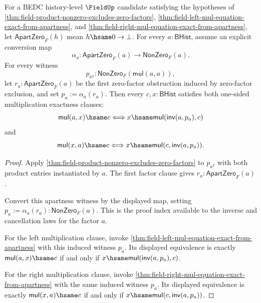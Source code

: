 
\begin{theorem}
\label{thm:field-square-nonzero-one-sided-mul-exact}
For a BEDC history-level $\FieldUp$ candidate satisfying the hypotheses of
\autoref{thm:field-product-nonzero-excludes-zero-factors},
\autoref{thm:field-left-mul-equation-exact-from-apartness}, and
\autoref{thm:field-right-mul-equation-exact-from-apartness}, let
$\mathsf{ApartZero}_F(h)$ mean $h\hsame0\to\bot$. For every
$a:\mathsf{BHist}$, assume an explicit conversion map
$$
\alpha_a:\mathsf{ApartZero}_F(a)\to\mathsf{NonZero}_F(a).
$$
For every witness
$$
p_{a^2}:\mathsf{NonZero}_F(\mathsf{mul}(a,a)),
$$
let $r_a:\mathsf{ApartZero}_F(a)$ be the first zero-factor obstruction induced
by zero-factor exclusion, and set $p_a:=\alpha_a(r_a)$. Then every
$c,x:\mathsf{BHist}$ satisfies both one-sided multiplication exactness clauses:
$$
\mathsf{mul}(a,x)\hsame c
\Longleftrightarrow
x\hsame \mathsf{mul}(\mathsf{inv}(a,p_a),c)
$$
and
$$
\mathsf{mul}(x,a)\hsame c
\Longleftrightarrow
x\hsame \mathsf{mul}(c,\mathsf{inv}(a,p_a)).
$$
\end{theorem}
\begin{proof}
Apply \autoref{thm:field-product-nonzero-excludes-zero-factors} to
$p_{a^2}$ with both product entries instantiated by $a$. The first factor
clause gives $r_a:\mathsf{ApartZero}_F(a)$.

Convert this apartness witness by the displayed map, setting
$p_a:=\alpha_a(r_a):\mathsf{NonZero}_F(a)$. This is the proof index available
to the inverse and cancellation laws for the factor $a$.

For the left multiplication clause, invoke
\autoref{thm:field-left-mul-equation-exact-from-apartness} with this
induced witness $p_a$. Its displayed equivalence is exactly
$\mathsf{mul}(a,x)\hsame c$ if and only if
$x\hsame \mathsf{mul}(\mathsf{inv}(a,p_a),c)$.

For the right multiplication clause, invoke
\autoref{thm:field-right-mul-equation-exact-from-apartness} with the same
induced witness $p_a$. Its displayed equivalence is exactly
$\mathsf{mul}(x,a)\hsame c$ if and only if
$x\hsame \mathsf{mul}(c,\mathsf{inv}(a,p_a))$.
\end{proof}

